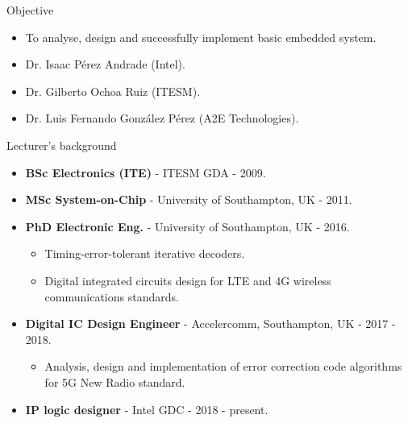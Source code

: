 \documentclass[]{slides}
\begin{document}
\printpdftrue %
\title[SoC design: Computer architecture - Course introduction]{\slidetitle}

\begin{frame} \titlepage \end{frame}


\begin{frame}{Objective}
  \begin{itemize}
    \item To analyse, design and successfully implement basic embedded system.
  \end{itemize}
  \begin{itemize}
    \item Dr. Isaac P\'erez Andrade (Intel).
    \item Dr. Gilberto Ochoa Ruiz (ITESM).
    \item Dr. Luis Fernando Gonz\'alez P\'erez (A2E Technologies).
  \end{itemize}
\end{frame}

\begin{frame}{Lecturer's background}
  \begin{itemize}
    \item \textbf{BSc Electronics (ITE)} - ITESM GDA - 2009.
    \item \textbf{MSc System-on-Chip} - University of Southampton, UK - 2011.
    \item \textbf{PhD Electronic Eng.} - University of Southampton, UK - 2016.
    \begin{itemize}
      \item Timing-error-tolerant iterative decoders.
      \item Digital integrated circuits design for LTE and 4G wireless communications standards.
    \end{itemize}
    \item \textbf{Digital IC Design Engineer} - Accelercomm, Southampton, UK - 2017 - 2018.
    \begin{itemize}
        \item Analysis, design and implementation of error correction code algorithms for 5G New Radio standard.
    \end{itemize}
    \item \textbf{IP logic designer} - Intel GDC - 2018 - present.
  \end{itemize}
\end{frame}
\end{document}
